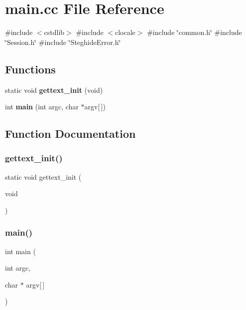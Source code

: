 \section{main.\+cc File Reference}
\label{src_2main_8cc}
{\ttfamily \#include $<$cstdlib$>$}\newline
{\ttfamily \#include $<$clocale$>$}\newline
{\ttfamily \#include \char`\"{}common.\+h\char`\"{}}\newline
{\ttfamily \#include \char`\"{}Session.\+h\char`\"{}}\newline
{\ttfamily \#include \char`\"{}Steghide\+Error.\+h\char`\"{}}\newline
\subsection*{Functions}
\begin{DoxyCompactItemize}
\item 
static void \textbf{ gettext\+\_\+init} (void)
\item 
int \textbf{ main} (int argc, char $\ast$argv[$\,$])
\end{DoxyCompactItemize}


\subsection{Function Documentation}
\mbox{\label{src_2main_8cc_aeb18f31b43c9a8ef26d854e9eb3fda48}} 
\subsubsection{gettext\+\_\+init()}
{\footnotesize\ttfamily static void gettext\+\_\+init (\begin{DoxyParamCaption}\item[{void}]{ }\end{DoxyParamCaption})\hspace{0.3cm}{\ttfamily [static]}}

\mbox{\label{src_2main_8cc_a0ddf1224851353fc92bfbff6f499fa97}} 
\subsubsection{main()}
{\footnotesize\ttfamily int main (\begin{DoxyParamCaption}\item[{int}]{argc,  }\item[{char $\ast$}]{argv[$\,$] }\end{DoxyParamCaption})}

